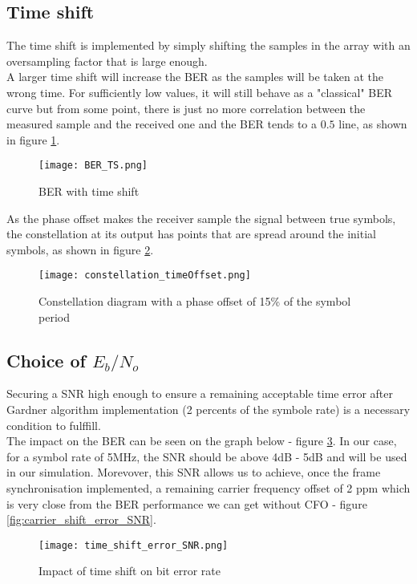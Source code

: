 \subsection{Time shift}
The time shift is implemented by simply shifting the samples in the array with an oversampling factor that is large enough. \\
A larger time shift will increase the BER as the samples will be taken at the wrong time. For sufficiently low values, it will still behave as a "classical" BER curve but from some point, there is just no more correlation between the measured sample and the received one and the BER tends to a $0.5$ line, as shown in figure \ref{fig:BER_TS}. \\

\begin{figure}[H]
    \centering
    \texttt{[image: BER\_TS.png]}
    \caption{BER with time shift}
    \label{fig:BER_TS}
\end{figure}

As the phase offset makes the receiver sample the signal between true symbols, the constellation at its output has points that are spread around the initial symbols, as shown in figure \ref{fig:phaseShiftConst}. 

\begin{figure}[H]
    \centering
    \texttt{[image: constellation\_timeOffset.png]}
    \caption{Constellation diagram with a phase offset of 15\% of the symbol period}
    \label{fig:phaseShiftConst}
\end{figure}

\subsection{Choice of $E_{b}/N_{o}$}
Securing a SNR high enough to ensure a remaining acceptable time error after Gardner algorithm implementation
 (2 percents of the symbole rate) is a necessary condition to fulffill.\\
The impact on the BER can be seen on the graph below - figure \ref{fig:time_shift_error_SNR}.
In our case, for a symbol rate of 5MHz, the SNR should be above 4dB - 5dB and will be used in our simulation.
Morevover, this SNR allows us to achieve, once the frame synchronisation implemented, a remaining carrier frequency offset
of 2 ppm which is very close from the BER performance we can get without CFO - figure \ref{fig:carrier_shift_error_SNR}.


\begin{figure}[H]
    \centering
    \texttt{[image: time\_shift\_error\_SNR.png]}
    \caption{Impact of time shift on bit error rate}
    \label{fig:time_shift_error_SNR}
\end{figure}

